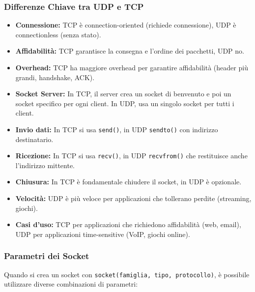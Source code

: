 \subsubsection{Differenze Chiave tra UDP e TCP}
\begin{itemize}
    \item \textbf{Connessione:} TCP è connection-oriented (richiede connessione), UDP è connectionless (senza stato).
    \item \textbf{Affidabilità:} TCP garantisce la consegna e l'ordine dei pacchetti, UDP no.
    \item \textbf{Overhead:} TCP ha maggiore overhead per garantire affidabilità (header più grandi, handshake, ACK).
    \item \textbf{Socket Server:} In TCP, il server crea un socket di benvenuto e poi un socket specifico per ogni client. In UDP, usa un singolo socket per tutti i client.
    \item \textbf{Invio dati:} In TCP si usa \texttt{send()}, in UDP \texttt{sendto()} con indirizzo destinatario.
    \item \textbf{Ricezione:} In TCP si usa \texttt{recv()}, in UDP \texttt{recvfrom()} che restituisce anche l'indirizzo mittente.
    \item \textbf{Chiusura:} In TCP è fondamentale chiudere il socket, in UDP è opzionale.
    \item \textbf{Velocità:} UDP è più veloce per applicazioni che tollerano perdite (streaming, giochi).
    \item \textbf{Casi d'uso:} TCP per applicazioni che richiedono affidabilità (web, email), UDP per applicazioni time-sensitive (VoIP, giochi online).
\end{itemize}

\subsubsection{Parametri dei Socket}
Quando si crea un socket con \texttt{socket(famiglia, tipo, protocollo)}, è possibile utilizzare diverse combinazioni di parametri:

